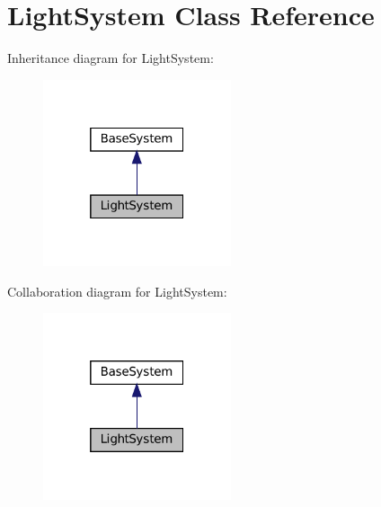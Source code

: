 \hypertarget{classLightSystem}{}\section{Light\+System Class Reference}
\label{classLightSystem}


Inheritance diagram for Light\+System\+:
\nopagebreak
\begin{figure}[H]
\begin{center}
\leavevmode
\includegraphics[width=157pt]{classLightSystem__inherit__graph}
\end{center}
\end{figure}


Collaboration diagram for Light\+System\+:
\nopagebreak
\begin{figure}[H]
\begin{center}
\leavevmode
\includegraphics[width=157pt]{classLightSystem__coll__graph}
\end{center}
\end{figure}
